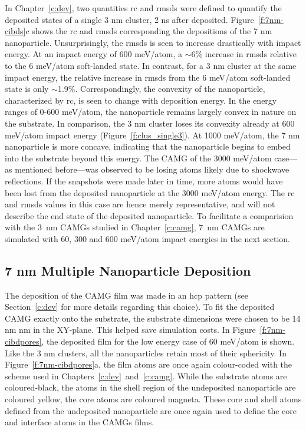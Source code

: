 In Chapter~\ref{c:dev}, two quantities \gls{rc} and \gls{rmsds} were defined to quantify the deposited states of a single 3 nm cluster, 2 ns after deposited. Figure~\ref{f:7nm-cibds}c shows the \gls{rc} and \gls{rmsds} corresponding the depositions of the 7 nm nanoparticle. Unsurprisingly, the \gls{rmsds} is seen to increase drastically with impact energy. At an impact energy of 600 meV/atom, a $\sim$6\% increase in \gls{rmsds} relative to the 6 meV/atom soft-landed state. In contrast, for a 3 nm cluster at the same impact energy, the relative increase in \gls{rmsds} from the 6 meV/atom soft-landed state is only $\sim$1.9\%. Correspondingly, the convexity of the nanoparticle, characterized by \gls{rc}, is seen to change with deposition energy. In the energy ranges of 0-600 meV/atom, the nanoparticle remains largely convex in nature on the substrate. In comparison, the 3 nm cluster loses its convexity already at 600 meV/atom impact energy (Figure~\ref{f:clus_single3}). At 1000 meV/atom, the 7 nm nanoparticle is more concave, indicating that the nanoparticle begins to embed into the substrate beyond this energy. The CAMG of the 3000 meV/atom case---as mentioned before---was observed to be losing atoms likely due to shockwave reflections. If the snapshots were made later in time, more atoms would have been lost from the deposited nanoparticle at the 3000 meV/atom energy. The \gls{rc} and \gls{rmsds} values in this case are hence merely representative, and will not describe the end state of the deposited nanoparticle. To facilitate a comparision with the \mbox{3 nm} CAMGs studied in Chapter~\ref{c:camg}, \mbox{7 nm} CAMGs are simulated with 60, 300 and 600 meV/atom impact energies in the next section. \par

\subsection{7 nm \cz Multiple Nanoparticle Deposition}
The deposition of the CAMG film was made in an \gls{hcp} pattern (see Section~\ref{c:dev} for more details regarding this choice). To fit the deposited CAMG exactly onto the substrate, the substrate dimensions were chosen to be 14 nm  nm in the XY-plane. This helped save simulation costs. In Figure~\ref{f:7nm-cibdpores}, the deposited film for the low energy case of 60 meV/atom is shown. Like the 3 nm clusters, all the nanoparticles retain most of their sphericity. In Figure~\ref{f:7nm-cibdpores}a, the film atoms are once again colour-coded with the scheme used in Chapters~\ref{c:dev}~and~\ref{c:camg}. While the substrate atoms are coloured-black, the atoms in the shell region of the undeposited nanoparticle are coloured yellow, the core atoms are coloured magneta. These core and shell atoms defined from the undeposited nanoparticle are once again used to define the core and interface atoms in the CAMGs films. \par

